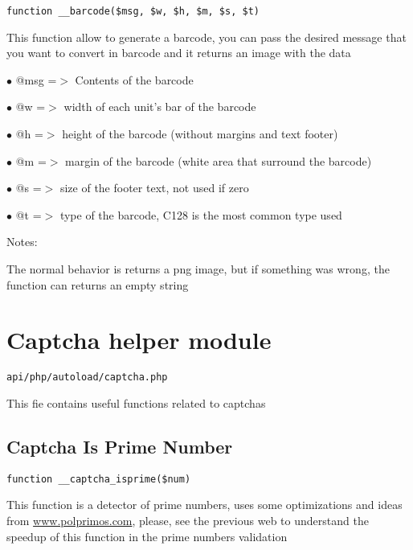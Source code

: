 \documentclass[a4paper]{book}
\def\htmladdnormallink#1#2{\href{#2}{#1}}
\begin{document}
\begin{lstlisting}
function __barcode($msg, $w, $h, $m, $s, $t)
\end{lstlisting}

This function allow to generate a barcode, you can pass the desired
message that you want to convert in barcode and it returns an image
with the data

\begin{compactitem}
\item[\color{myblue}$\bullet$] @msg =$>$ Contents of the barcode
\item[\color{myblue}$\bullet$] @w   =$>$ width of each unit's bar of the barcode
\item[\color{myblue}$\bullet$] @h   =$>$ height of the barcode (without margins and text footer)
\item[\color{myblue}$\bullet$] @m   =$>$ margin of the barcode (white area that surround the barcode)
\item[\color{myblue}$\bullet$] @s   =$>$ size of the footer text, not used if zero
\item[\color{myblue}$\bullet$] @t   =$>$ type of the barcode, C128 is the most common type used
\end{compactitem}

Notes:

The normal behavior is returns a png image, but if something was wrong,
the function can returns an empty string

\hypertarget{toc44}{}
\section{Captcha helper module}

\begin{lstlisting}
api/php/autoload/captcha.php
\end{lstlisting}

This fie contains useful functions related to captchas

\hypertarget{toc45}{}
\subsection{Captcha Is Prime Number}

\begin{lstlisting}
function __captcha_isprime($num)
\end{lstlisting}

This function is a detector of prime numbers, uses some optimizations and
ideas from \htmladdnormallink{www.polprimos.com}{www.polprimos.com}, please, see the previous web to understand
the speedup of this function in the prime numbers validation
\end{document}

